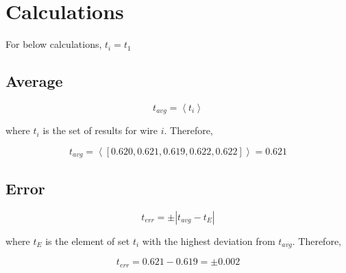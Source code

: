 \documentclass{article}
\def\mean#1{\left< #1 \right>}
\def\abs#1{\left| #1 \right|}
\numberwithin{equation}{subsection}
\begin{document}
        \section{Calculations}
            \centerline{For below calculations, \(t_{i}=t_{1}\)}
            \subsection{Average}
                \begin{equation} \label{eq:avg}
                    t_{avg}=\mean{t_{i}}
                \end{equation}
                \centerline{where \(t_{i}\) is the set of results for wire \(i\).
                Therefore,}
                \begin{equation}
                    t_{avg}=\mean{[0.620,0.621,0.619,0.622,0.622]}=0.621
                \end{equation}

            \subsection{Error}
                \begin{equation} \label{eq:err}
                    t_{err}=\pm\abs{t_{avg}-t_{E}}
                \end{equation}
                \centerline{where \(t_{E}\) is the element of set \(t_{i}\) with
                the highest deviation from \(t_{avg}\). Therefore,}
                \begin{equation}
                    t_{err}=0.621-0.619=\pm0.002
                \end{equation}
\end{document}
